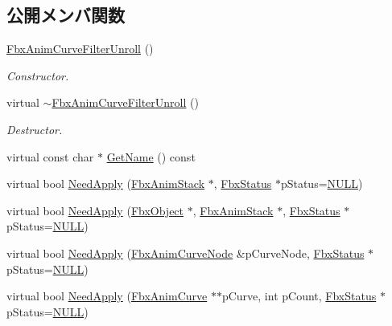\subsection*{公開メンバ関数}
\begin{DoxyCompactItemize}
\item 
\hyperlink{class_fbx_anim_curve_filter_unroll_a8500355d825ebd7d853bc2b9ab561e40}{Fbx\+Anim\+Curve\+Filter\+Unroll} ()
\begin{DoxyCompactList}\small\item\em Constructor. \end{DoxyCompactList}\item 
virtual \hyperlink{class_fbx_anim_curve_filter_unroll_abbbb5d22a6d7dc281385d7fbc4706e45}{$\sim$\+Fbx\+Anim\+Curve\+Filter\+Unroll} ()
\begin{DoxyCompactList}\small\item\em Destructor. \end{DoxyCompactList}\item 
virtual const char $\ast$ \hyperlink{class_fbx_anim_curve_filter_unroll_a01282004cc60febeff844d9c44f94e5c}{Get\+Name} () const
\item 
virtual bool \hyperlink{class_fbx_anim_curve_filter_unroll_a8380c6817fbf19d347b0bd0b5ae9a57b}{Need\+Apply} (\hyperlink{class_fbx_anim_stack}{Fbx\+Anim\+Stack} $\ast$, \hyperlink{class_fbx_status}{Fbx\+Status} $\ast$p\+Status=\hyperlink{fbxarch_8h_a070d2ce7b6bb7e5c05602aa8c308d0c4}{N\+U\+LL})
\item 
virtual bool \hyperlink{class_fbx_anim_curve_filter_unroll_a1ab6063269085792ebaa82e0812ae362}{Need\+Apply} (\hyperlink{class_fbx_object}{Fbx\+Object} $\ast$, \hyperlink{class_fbx_anim_stack}{Fbx\+Anim\+Stack} $\ast$, \hyperlink{class_fbx_status}{Fbx\+Status} $\ast$p\+Status=\hyperlink{fbxarch_8h_a070d2ce7b6bb7e5c05602aa8c308d0c4}{N\+U\+LL})
\item 
virtual bool \hyperlink{class_fbx_anim_curve_filter_unroll_ad3df0b89af14237342197a8832e3d94f}{Need\+Apply} (\hyperlink{class_fbx_anim_curve_node}{Fbx\+Anim\+Curve\+Node} \&p\+Curve\+Node, \hyperlink{class_fbx_status}{Fbx\+Status} $\ast$p\+Status=\hyperlink{fbxarch_8h_a070d2ce7b6bb7e5c05602aa8c308d0c4}{N\+U\+LL})
\item 
virtual bool \hyperlink{class_fbx_anim_curve_filter_unroll_a3b7eb044733da9665efe6dfd81e2445f}{Need\+Apply} (\hyperlink{class_fbx_anim_curve}{Fbx\+Anim\+Curve} $\ast$$\ast$p\+Curve, int p\+Count, \hyperlink{class_fbx_status}{Fbx\+Status} $\ast$p\+Status=\hyperlink{fbxarch_8h_a070d2ce7b6bb7e5c05602aa8c308d0c4}{N\+U\+LL})
$$
\end{DoxyCompactItemize}
